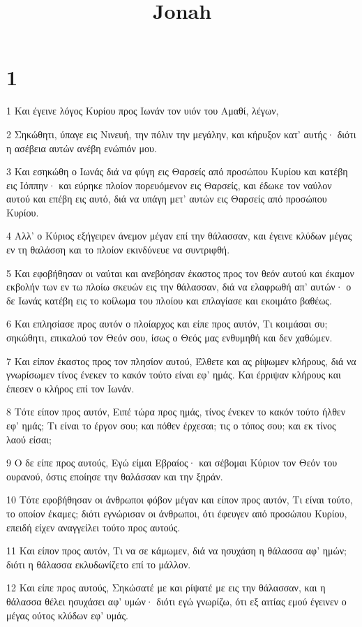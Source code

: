 

\title{Jonah}


\chapter{1}

\par 1 Και έγεινε λόγος Κυρίου προς Ιωνάν τον υιόν του Αμαθί, λέγων,
\par 2 Σηκώθητι, ύπαγε εις Νινευή, την πόλιν την μεγάλην, και κήρυξον κατ' αυτής· διότι η ασέβεια αυτών ανέβη ενώπιόν μου.
\par 3 Και εσηκώθη ο Ιωνάς διά να φύγη εις Θαρσείς από προσώπου Κυρίου και κατέβη εις Ιόππην· και εύρηκε πλοίον πορευόμενον εις Θαρσείς, και έδωκε τον ναύλον αυτού και επέβη εις αυτό, διά να υπάγη μετ' αυτών εις Θαρσείς από προσώπου Κυρίου.
\par 4 Αλλ' ο Κύριος εξήγειρεν άνεμον μέγαν επί την θάλασσαν, και έγεινε κλύδων μέγας εν τη θαλάσση και το πλοίον εκινδύνευε να συντριφθή.
\par 5 Και εφοβήθησαν οι ναύται και ανεβόησαν έκαστος προς τον θεόν αυτού και έκαμον εκβολήν των εν τω πλοίω σκευών εις την θάλασσαν, διά να ελαφρωθή απ' αυτών· ο δε Ιωνάς κατέβη εις το κοίλωμα του πλοίου και επλαγίασε και εκοιμάτο βαθέως.
\par 6 Και επλησίασε προς αυτόν ο πλοίαρχος και είπε προς αυτόν, Τι κοιμάσαι συ; σηκώθητι, επικαλού τον Θεόν σου, ίσως ο Θεός μας ενθυμηθή και δεν χαθώμεν.
\par 7 Και είπον έκαστος προς τον πλησίον αυτού, Έλθετε και ας ρίψωμεν κλήρους, διά να γνωρίσωμεν τίνος ένεκεν το κακόν τούτο είναι εφ' ημάς. Και έρριψαν κλήρους και έπεσεν ο κλήρος επί τον Ιωνάν.
\par 8 Τότε είπον προς αυτόν, Ειπέ τώρα προς ημάς, τίνος ένεκεν το κακόν τούτο ήλθεν εφ' ημάς; Τι είναι το έργον σου; και πόθεν έρχεσαι; τις ο τόπος σου; και εκ τίνος λαού είσαι;
\par 9 Ο δε είπε προς αυτούς, Εγώ είμαι Εβραίος· και σέβομαι Κύριον τον Θεόν του ουρανού, όστις εποίησε την θαλάσσαν και την ξηράν.
\par 10 Τότε εφοβήθησαν οι άνθρωποι φόβον μέγαν και είπον προς αυτόν, Τι είναι τούτο, το οποίον έκαμες; διότι εγνώρισαν οι άνθρωποι, ότι έφευγεν από προσώπου Κυρίου, επειδή είχεν αναγγείλει τούτο προς αυτούς.
\par 11 Και είπον προς αυτόν, Τι να σε κάμωμεν, διά να ησυχάση η θάλασσα αφ' ημών; διότι η θάλασσα εκλυδωνίζετο επί το μάλλον.
\par 12 Και είπε προς αυτούς, Σηκώσατέ με και ρίψατέ με εις την θάλασσαν, και η θάλασσα θέλει ησυχάσει αφ' υμών· διότι εγώ γνωρίζω, ότι εξ αιτίας εμού έγεινεν ο μέγας ούτος κλύδων εφ' υμάς.
